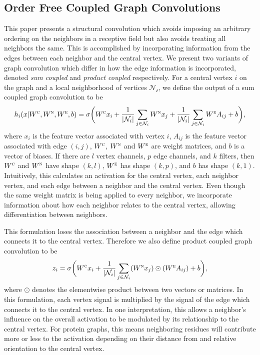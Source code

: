 \subsection{Order Free Coupled Graph Convolutions}
This paper presents a structural convolution which avoids imposing an arbitrary ordering on the neighbors in a receptive field but also avoids treating all neighbors the same.
This is accomplished by incorporating information from the edges between each neighbor and the central vertex.
We present two variants of graph convolution which differ in how the edge information is incorporated, denoted \textit{sum coupled} and \textit{product coupled} respectively.
For a central vertex $i$ on the graph and a local neighborhood of vertices $\mathcal{N_i}$, we define the output of a sum coupled graph convolution to be
\begin{equation}
h_i(x | W^\textsc{c}, W^\textsc{n}, W^\textsc{e}, b) = \sigma \bigg( W^{\textsc{c}} x_i + \frac{1}{|\mathcal{N}_i|}\sum_{j \in \mathcal{N}_i} W^{\textsc{n}} x_j + \frac{1}{|\mathcal{N}_i|}\sum_{j \in \mathcal{N}_i} W^{\textsc{e}} A_{ij} + b \bigg),
\label{eq:sum_coupling}
\end{equation}
where $x_i$ is the feature vector associated with vertex $i$, $A_{ij}$ is the feature vector associated with edge $(i, j)$, $W^\textsc{c}$, $W^\textsc{n}$ and $W^\textsc{e}$ are weight matrices, and $b$ is a vector of biases. 
If there are $l$ vertex channels, $p$ edge channels, and $k$ filters, then $W^\textsc{c}$ and $W^\textsc{n}$ have shape $(k, l)$, $W^\textsc{e}$ has shape $(k, p)$, and $b$ has shape $(k, 1)$.
Intuitively, this calculates an activation for the central vertex, each neighbor vertex, and each edge between a neighbor and the central vertex.
Even though the same weight matrix is being applied to every neighbor, we incorporate information about how each neighbor relates to the central vertex, allowing differentiation between neighbors. 

This formulation loses the association between a neighbor and the edge which connects it to the central vertex. 
Therefore we also define product coupled graph convolution to be 
\begin{equation}
z_i = \sigma \bigg( W^{\textsc{c}} x_i + \frac{1}{|\mathcal{N}_i|}\sum_{j \in \mathcal{N}_i} (W^{\textsc{n}} x_j) \odot (W^{\textsc{e}} A_{ij}) + b \bigg),
\label{eq:prod_coupling}
\end{equation}
where $\odot$ denotes the elementwise product between two vectors or matrices. 
In this formulation, each vertex signal is multiplied by the signal of the edge which connects it to the central vertex.
In one interpretation, this allows a neighbor's influence on the overall activation to be modulated by its relationship to the central vertex.
For protein graphs, this means neighboring residues will contribute more or less to the activation depending on their distance from and relative orientation to the central vertex.

